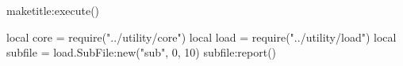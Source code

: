 \documentclass[11pt, a4paper]{report}
\begin{document}
    \begin{luacode*}
        maketitle:execute()
    \end{luacode*}

    \tableofcontents

    \begin{luacode*}
        local core = require("../utility/core")
        local load = require("../utility/load")
        local subfile = load.SubFile:new("sub", 0, 10)
        subfile:report()
    \end{luacode*}

    
    
\end{document}
